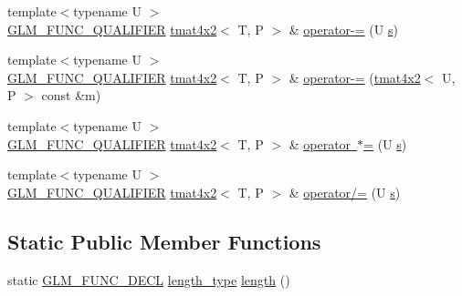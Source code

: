 \begin{DoxyCompactItemize}
\item 
{\footnotesize template$<$typename U $>$ }\\\mbox{\hyperlink{setup_8hpp_a33fdea6f91c5f834105f7415e2a64407}{G\+L\+M\+\_\+\+F\+U\+N\+C\+\_\+\+Q\+U\+A\+L\+I\+F\+I\+ER}} \mbox{\hyperlink{structglm_1_1tmat4x2}{tmat4x2}}$<$ T, P $>$ \& \mbox{\hyperlink{structglm_1_1tmat4x2_ae2ad696a80928bd3ba571e8e65b196fb}{operator-\/=}} (U \mbox{\hyperlink{glad_8h_af1b1d5edfea6a34daee7389b1b5810ad}{s}})
\item 
{\footnotesize template$<$typename U $>$ }\\\mbox{\hyperlink{setup_8hpp_a33fdea6f91c5f834105f7415e2a64407}{G\+L\+M\+\_\+\+F\+U\+N\+C\+\_\+\+Q\+U\+A\+L\+I\+F\+I\+ER}} \mbox{\hyperlink{structglm_1_1tmat4x2}{tmat4x2}}$<$ T, P $>$ \& \mbox{\hyperlink{structglm_1_1tmat4x2_a543c1cb13551ba460439f6546e813c4c}{operator-\/=}} (\mbox{\hyperlink{structglm_1_1tmat4x2}{tmat4x2}}$<$ U, P $>$ const \&m)
\item 
{\footnotesize template$<$typename U $>$ }\\\mbox{\hyperlink{setup_8hpp_a33fdea6f91c5f834105f7415e2a64407}{G\+L\+M\+\_\+\+F\+U\+N\+C\+\_\+\+Q\+U\+A\+L\+I\+F\+I\+ER}} \mbox{\hyperlink{structglm_1_1tmat4x2}{tmat4x2}}$<$ T, P $>$ \& \mbox{\hyperlink{structglm_1_1tmat4x2_afefc56455682175c33d7f743d1072b27}{operator $\ast$=}} (U \mbox{\hyperlink{glad_8h_af1b1d5edfea6a34daee7389b1b5810ad}{s}})
\item 
{\footnotesize template$<$typename U $>$ }\\\mbox{\hyperlink{setup_8hpp_a33fdea6f91c5f834105f7415e2a64407}{G\+L\+M\+\_\+\+F\+U\+N\+C\+\_\+\+Q\+U\+A\+L\+I\+F\+I\+ER}} \mbox{\hyperlink{structglm_1_1tmat4x2}{tmat4x2}}$<$ T, P $>$ \& \mbox{\hyperlink{structglm_1_1tmat4x2_a7ad8f4359e6257d46c597bc345d90205}{operator/=}} (U \mbox{\hyperlink{glad_8h_af1b1d5edfea6a34daee7389b1b5810ad}{s}})
\end{DoxyCompactItemize}
\subsection*{Static Public Member Functions}
\begin{DoxyCompactItemize}
\item 
static \mbox{\hyperlink{setup_8hpp_ab2d052de21a70539923e9bcbf6e83a51}{G\+L\+M\+\_\+\+F\+U\+N\+C\+\_\+\+D\+E\+CL}} \mbox{\hyperlink{structglm_1_1tmat4x2_a28aaf36ee36edef6715c1fae6874f530}{length\+\_\+type}} \mbox{\hyperlink{structglm_1_1tmat4x2_ac92a6ef242b14bc41a187b58984e4968}{length}} ()
\end{DoxyCompactItemize}


